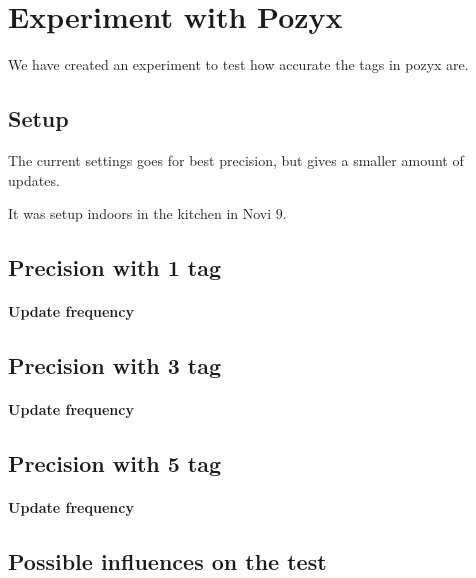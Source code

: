 \section{Experiment with Pozyx}
We have created an experiment to test how accurate the tags in pozyx are.

\subsection{Setup}
The current settings goes for best precision, but gives a smaller amount of updates.

It was setup indoors in the kitchen in Novi 9.

\subsection{Precision with 1 tag}

\paragraph{Update frequency}

\subsection{Precision with 3 tag}

\paragraph{Update frequency}

\subsection{Precision with 5 tag}

\paragraph{Update frequency}

\subsection{Possible influences on the test}



